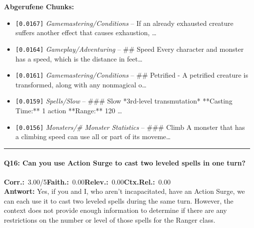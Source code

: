 \noindent\textbf{Abgerufene Chunks:}
\begin{itemize}[noitemsep, topsep=2pt]
  \item[\textbf{\#1}] \texttt{[0.0167]} \textit{Gamemastering/Conditions} -- If an already exhausted creature suffers another effect that causes exhaustion, \ldots
  \item[\textbf{\#2}] \texttt{[0.0164]} \textit{Gameplay/Adventuring} -- \#\# Speed  Every character and monster has a speed, which is the distance in feet\ldots
  \item[\textbf{\#3}] \texttt{[0.0161]} \textit{Gamemastering/Conditions} -- \#\# Petrified  - A petrified creature is transformed, along with any nonmagical o\ldots
  \item[\textbf{\#4}] \texttt{[0.0159]} \textit{Spells/Slow} -- \#\#\# Slow  *3rd-level transmutation*  **Casting Time:** 1 action  **Range:** 120 \ldots
  \item[\textbf{\#5}] \texttt{[0.0156]} \textit{Monsters/# Monster Statistics} -- \#\#\# Climb  A monster that has a climbing speed can use all or part of its moveme\ldots
\end{itemize}
\vspace{4pt}
\hrule
\vspace{6pt}

\paragraph{Q16: Can you use Action Surge to cast two leveled spells in one turn?}
\noindent \textbf{Corr.:}~3.00/5\quad \textbf{Faith.:}~0.00\quad \textbf{Relev.:}~0.00\quad \textbf{Ctx.Rel.:}~0.00\\

\noindent\textbf{Antwort:} Yes, if you and I, who aren't incapacitated, have an Action Surge, we can each use it to cast two leveled spells during the same turn. However, the context does not provide enough information to determine if there are any restrictions on the number or level of those spells for the Ranger class.

